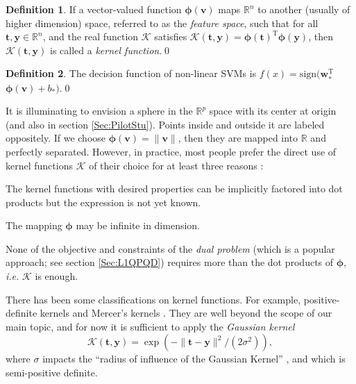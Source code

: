 \documentclass[11pt,a4paper]{article}
\theoremstyle{definition}
\newtheorem{defi}{Definition}
\renewcommand{\vec}[1]{\boldsymbol{#1}}
\begin{document}
      \begin{defi}
        If a vector-valued function $\vec{\phi}(\vec{v})$ maps $\mathbb{R}^{n}$ to another (usually of higher dimension) space, referred to as the \textit{feature space}, such that for all $\vec{t},\vec{y}\in\mathbb{R}^{n}$, and the real function $\mathcal{K}$ satisfies $\mathcal{K}(\vec{t},\vec{y})=\vec{\phi}(\vec{t})^{\mathrm{T}}\vec{\phi}(\vec{y})$, then $\mathcal{K}(\vec{t},\vec{y})$ is called a \textit{kernel function}.\qed
      \end{defi}

      \begin{defi}\label{Def:NLSVMf}
        The decision function of non-linear SVMs is $f(x)=\text{sign}(\vec{w}_{*}^{\mathrm{T}}$\\$\vec{\phi}(\vec{v})+b_{*})$.\qed
      \end{defi}

      It is illuminating to envision a sphere in the $\mathbb{R}^{p}$ space with its center at origin (and also in section \ref{Sec:PilotStu}). Points inside and outside it are labeled oppositely. If we choose $\vec{\phi}(\vec{v})=\|\vec{v}\|$, then they are mapped into $\mathbb{R}$ and perfectly separated. However, in practice, most people prefer the direct use of kernel functions $\mathcal{K}$ of their choice for at least three reasons \cite{boser1992training,fletcher2010binary,hofmann2008kernel}:
      \begin{inparaenum}[a)]
        \item The kernel functions with desired properties can be implicitly factored into dot products but the expression is not yet known.
        \item The mapping $\vec{\phi}$ may be infinite in dimension.
        \item None of the objective and constraints of the \textit{dual problem} (which is a popular approach; see section \ref{Sec:L1QPQD}) requires more than the dot products of $\vec{\phi}$, \textit{i.e.} $\mathcal{K}$ is enough.
      \end{inparaenum}

      There has been some classifications on kernel functions. For example, positive-definite kernels and Mercer's kernels \cite{mercer1909functions}. They are well beyond the scope of our main topic, and for now it is sufficient to apply the \textit{Gaussian kernel}
      \begin{equation}
        \mathcal{K}(\vec{t},\vec{y})=\exp(-\|\vec{t}-\vec{y}\|^{2}/(2\sigma^{2})),
      \end{equation}
      where $\sigma$ impacts the ``radius of influence of the Gaussian Kernel'' \cite{fletcher2010binary}, and which is semi-positive definite.
\end{document}
